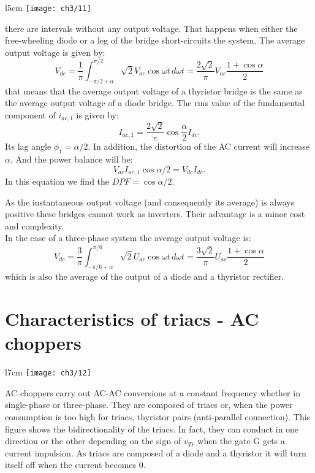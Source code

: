 		\begin{wrapfigure}[12]{l}{5cm}
		\vspace{0mm}
		\texttt{[image: ch3/11]}
		\label{fig:3.11}
		\end{wrapfigure}
		there are intervals without any output voltage. That happens when either the free-wheeling diode or a leg of the bridge short-circuits the system. The average output voltage is given by: 
		\begin{equation}
			V_{dc} = \frac{1}{\pi} \int _{-\pi /2 +\alpha} ^{\pi /2} \sqrt{2} V_{ac} \cos \omega t \, d\omega t = \frac{2\sqrt{2}}{\pi} V_{ac} \frac{1+\cos \alpha}{2}
		\end{equation}
		that means that the average output voltage of a thyristor bridge is the same as the average output voltage of a diode bridge.
		The rms value of the fundamental component of $i_{ac,1}$ is given by: 
		\begin{equation}
			I_{ac,1} = \frac{2\sqrt{2}}{\pi} \cos \frac{\alpha}{2} I_{dc}.
		\end{equation}
		Its lag angle $\phi _1 = \alpha /2$. In addition, the distortion of the AC current will increase $\alpha$. And the power balance will be: 
		\begin{equation}
			V_{ac}I_{ac,1}\cos\alpha /2= V_{dc}I_{dc}. 
		\end{equation}
		In this equation we find the $DPF = \cos \alpha /2$.
		
		As the instantaneous output voltage (and consequently its average) is always positive these bridges cannot work as inverters. Their advantage is a minor cost and complexity. \\
		
		In the case of a three-phase system the average output voltage is: 
		\begin{equation}
			V_{dc} = \frac{3}{\pi} \int _{-\pi /6 + \alpha}^{\pi /6} \sqrt{2} U_{ac} \cos \omega t \, d\omega t = \frac{3\sqrt{2}}{\pi}U_{ac} \frac{1+\cos \alpha}{2}
		\end{equation}
		which is also the average of the output of a diode and a thyristor rectifier.
		
	\section{Characteristics of triacs - AC choppers}
		\begin{wrapfigure}[10]{l}{7cm}
		\vspace{-5mm}
		\texttt{[image: ch3/12]}
		\label{fig:3.12}
		\end{wrapfigure}
		AC choppers carry out AC-AC conversions at a constant frequency whether in single-phase or three-phase. They are composed of triacs or, when the power consumption is too high for triacs, thyristor pairs (anti-parallel connection). This figure shows the bidirectionality of the triacs. In fact, they can conduct in one direction or the other depending on the sign of $v_{Tr}$ when the gate G gets a current impulsion. As triacs are composed of a diode and a thyristor it will turn itself off when the current becomes 0. 
		

